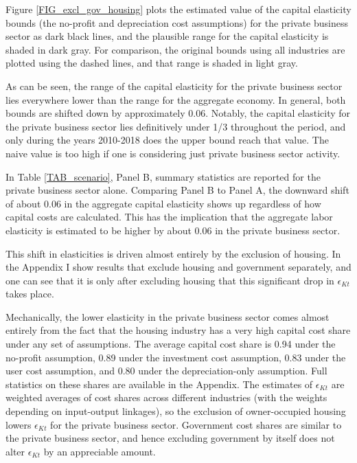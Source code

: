 \documentclass[11pt]{article}
\begin{document}
Figure \ref{FIG_excl_gov_housing} plots the estimated value of the capital elasticity bounds (the no-profit and depreciation cost assumptions) for the private business sector as dark black lines, and the plausible range for the capital elasticity is shaded in dark gray. For comparison, the original bounds using all industries are plotted using the dashed lines, and that range is shaded in light gray. 

As can be seen, the range of the capital elasticity for the private business sector lies everywhere lower than the range for the aggregate economy. In general, both bounds are shifted down by approximately 0.06. Notably, the capital elasticity for the private business sector lies definitively under 1/3 throughout the period, and only during the years 2010-2018 does the upper bound reach that value. The naive value is too high if one is considering just private business sector activity.  

In Table \ref{TAB_scenario}, Panel B, summary statistics are reported for the private business sector alone. Comparing Panel B to Panel A, the downward shift of about 0.06 in the aggregate capital elasticity shows up regardless of how capital costs are calculated. This has the implication that the aggregate labor elasticity is estimated to be higher by about 0.06 in the private business sector. 

This shift in elasticities is driven almost entirely by the exclusion of housing. In the Appendix I show results that exclude housing and government separately, and one can see that it is only after excluding housing that this significant drop in $\epsilon_{Kt}$ takes place.

Mechanically, the lower elasticity in the private business sector comes almost entirely from the fact that the housing industry has a very high capital cost share under any set of assumptions. The average capital cost share is 0.94 under the no-profit assumption, 0.89 under the investment cost assumption, 0.83 under the user cost assumption, and 0.80 under the depreciation-only assumption. Full statistics on these shares are available in the Appendix. The estimates of $\epsilon_{Kt}$ are weighted averages of cost shares across different industries (with the weights depending on input-output linkages), so the exclusion of owner-occupied housing lowers $\epsilon_{Kt}$ for the private business sector. Government cost shares are similar to the private business sector, and hence excluding government by itself does not alter $\epsilon_{Kt}$ by an appreciable amount.
\end{document}
